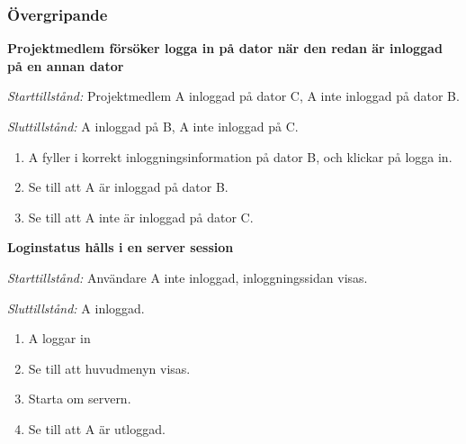 \documentclass[a4paper]{article}
\begin{document}
\subsubsection{Övergripande}

\begin{FT}
\item
\textbf{Projektmedlem försöker logga in på dator när den redan är inloggad på en annan dator}

\emph{Starttillstånd:} Projektmedlem A inloggad på dator C, A inte inloggad på dator B.

\emph{Sluttillstånd:} A inloggad på B, A inte inloggad på C.

\begin{enumerate}
\item A fyller i korrekt inloggningsinformation på dator B, och klickar på logga in.
\item Se till att A är inloggad på dator B.
\item Se till att A inte är inloggad på dator C.
\end{enumerate}


%
%
%

\item
\textbf{Loginstatus hålls i en server session}

\emph{Starttillstånd:} Användare A inte inloggad, inloggningssidan visas.

\emph{Sluttillstånd:} A inloggad.

\begin{enumerate}
\item A loggar in
\item Se till att huvudmenyn visas.
\item Starta om servern.
\item Se till att A är utloggad.
\end{enumerate}




\end{FT}
\end{document}
